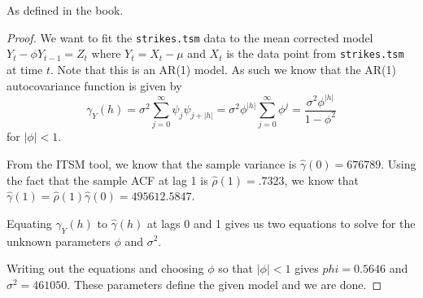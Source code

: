 \documentclass[12pt]{article}
\theoremstyle{definition}
\newenvironment{custompbm}[1]
  {\renewcommand\theproblem{#1}\problem}
  {\endproblem}
\begin{document}
\begin{custompbm}{3.10}
  As defined in the book.
\end{custompbm}

\begin{proof}
  We want to fit the \texttt{strikes.tsm} data to the mean corrected model
  $Y_t - \phi Y_{t-1} = Z_t$ where $Y_t = X_t - \mu$ and $X_t$ is the data point
  from \texttt{strikes.tsm} at time $t$. Note that this is an AR(1) model.
  As such we know that the AR(1) autocovariance function is given by
  \[
    \gamma_Y(h) = \sigma^2 \sum_{j=0} ^ \infty \psi_{j} \psi_{j + |h|} = \sigma^2 \phi^{|h|} \sum_{j=0}^\infty \phi^j = \frac{\sigma^2 \phi^{|h|}}{1-\phi^2}
  \]
  for $|\phi| < 1$.

  From the ITSM tool, we know that the sample variance is $\hat{\gamma}(0) = 676789$.
  Using the fact that the sample ACF at lag 1 is $\hat{\rho}(1) = .7323$, we know
  that $\hat{\gamma}(1) = \hat{\rho}(1)\hat{\gamma}(0) = 495612.5847$.

  Equating $\gamma_Y(h)$ to $\hat{\gamma}(h)$ at lags 0 and 1 gives us two equations
  to solve for the unknown parameters $\phi$ and $\sigma^2$.

  Writing out the equations and choosing $\phi$ so that $|\phi| < 1$ gives
  $phi=0.5646$ and $\sigma^2 = 461050$. These parameters define the given model
  and we are done.
\end{proof}
\end{document}

